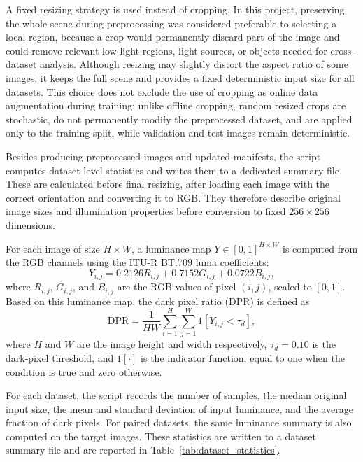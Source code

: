 A fixed resizing strategy is used instead of cropping. In this project, preserving the whole scene during preprocessing was considered preferable to selecting a local region, because a crop would permanently discard part of the image and could remove relevant low-light regions, light sources, or objects needed for cross-dataset analysis. Although resizing may slightly distort the aspect ratio of some images, it keeps the full scene and provides a fixed deterministic input size for all datasets. This choice does not exclude the use of cropping as online data augmentation during training: unlike offline cropping, random resized crops are stochastic, do not permanently modify the preprocessed dataset, and are applied only to the training split, while validation and test images remain deterministic.

Besides producing preprocessed images and updated manifests, the script computes dataset-level statistics and writes them to a dedicated summary file. These are calculated before final resizing, after loading each image with the correct orientation and converting it to RGB. They therefore describe original image sizes and illumination properties before conversion to fixed $256 \times 256$ dimensions.

For each image of size $H \times W$, a luminance map $Y \in [0,1]^{H \times W}$ is computed from the RGB channels using the ITU-R BT.709 luma coefficients:
\begin{equation}
	Y_{i,j} = 0.2126R_{i,j} + 0.7152G_{i,j} + 0.0722B_{i,j},
	\label{eq:luminance}
\end{equation}
where $R_{i,j}$, $G_{i,j}$, and $B_{i,j}$ are the RGB values of pixel $(i,j)$, scaled to $[0,1]$. Based on this luminance map, the dark pixel ratio (DPR) is defined as
\begin{equation}
	\mathrm{DPR}
	=
	\frac{1}{HW}
	\sum_{i=1}^{H}
	\sum_{j=1}^{W}
	1\left[Y_{i,j} < \tau_d\right],
	\label{eq:dpr}
\end{equation}
where $H$ and $W$ are the image height and width respectively, $\tau_d = 0.10$ is the dark-pixel threshold, and $1[\cdot]$ is the indicator function, equal to one when the condition is true and zero otherwise.

For each dataset, the script records the number of samples, the median original input size, the mean and standard deviation of input luminance, and the average fraction of dark pixels. For paired datasets, the same luminance summary is also computed on the target images. These statistics are written to a dataset summary file and are reported in Table~\ref{tab:dataset_statistics}.

